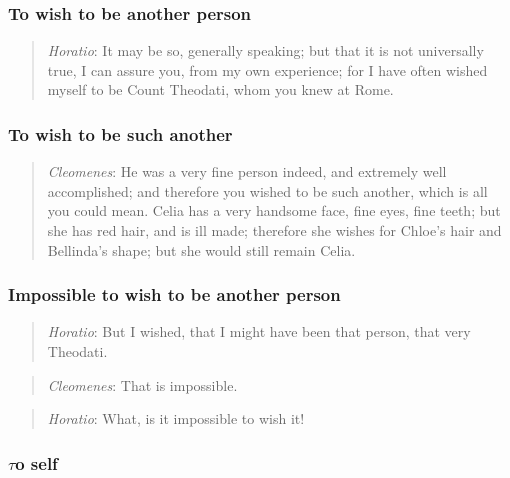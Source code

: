         \subsubsection{To wish to be another person}

            \begin{quote}
                \textit{Horatio}: It may be so, generally speaking; but that it is not universally true, I can assure you, from my own experience; for I have often wished myself to be Count Theodati, whom you knew at Rome.
            \end{quote}

        \subsubsection{To wish to be such another}

            \begin{quote}
                \textit{Cleomenes}: He was a very fine person indeed, and extremely well accomplished; and therefore you wished to be such another, which is all you could mean. Celia has a very handsome face, fine eyes, fine teeth; but she has red hair, and is ill made; therefore she wishes for Chloe’s hair and Bellinda’s shape; but she would still remain Celia.
            \end{quote}

        \subsubsection{Impossible to wish to be another person}

            \begin{quote}
                \textit{Horatio}: But I wished, that I might have been that person, that very Theodati.
            \end{quote}

            \begin{quote}
                \textit{Cleomenes}: That is impossible.
            \end{quote}

            \begin{quote}
                \textit{Horatio}: What, is it impossible to wish it!
            \end{quote}

        \subsubsection{\(\tau\)o self}

